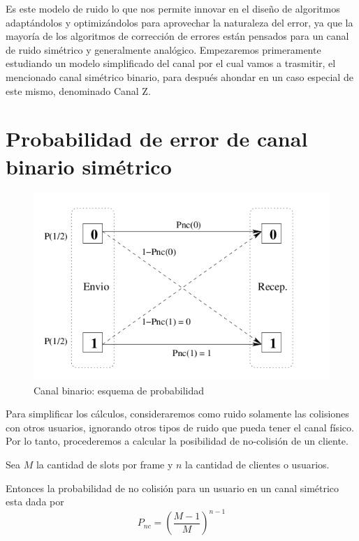 Es este modelo de ruido lo que nos permite innovar en el diseño de algoritmos adaptándolos y optimizándolos para aprovechar la naturaleza del error, ya que la mayoría de los algoritmos de corrección de errores están pensados para un canal de ruido simétrico y generalmente analógico.
Empezaremos primeramente estudiando un modelo simplificado del canal por el cual vamos a trasmitir, el mencionado canal simétrico binario, para después ahondar en un caso especial de este mismo, denominado Canal Z.

\section{Probabilidad de error de canal binario simétrico}

\begin{figure}[t]
  \begin{center}
    \includegraphics[scale=0.60]{capacidad/canalBinario.png}
  \end{center}
\caption {Canal binario: esquema de probabilidad}
\label{fig:canbin}
\end{figure}

Para simplificar los cálculos, consideraremos como ruido solamente las colisiones con otros usuarios, ignorando otros tipos de ruido que pueda tener el canal físico. Por lo tanto, procederemos a calcular la posibilidad de no-colisión de un cliente.

Sea $M$ la cantidad de slots por frame y $n$ la cantidad de clientes o usuarios.

Entonces la probabilidad de no colisión para un usuario en un canal simétrico esta dada por
\begin{equation}
P_{nc}=\left(\frac{M-1}{M}\right)^{n-1}
\end{equation}


